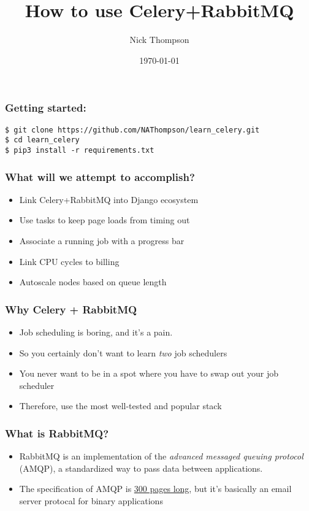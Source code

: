 \documentclass[9pt]{beamer}
\begin{document}
\title{How to use Celery+RabbitMQ}
\author{Nick Thompson} 
\date{\today}

\frame{\titlepage}

\begin{frame}[fragile]
\frametitle{Getting started:}
\begin{verbatim}
$ git clone https://github.com/NAThompson/learn_celery.git
$ cd learn_celery
$ pip3 install -r requirements.txt
\end{verbatim}
\end{frame}

\begin{frame}[fragile]
  \frametitle{What will we attempt to accomplish?}
  
  \begin{itemize}
  \item Link Celery+RabbitMQ into Django ecosystem
    \pause
  \item Use tasks to keep page loads from timing out
    \pause
  \item Associate a running job with a progress bar
    \pause
  \item Link CPU cycles to billing
    \pause
  \item Autoscale nodes based on queue length
  \end{itemize}
\end{frame}

\begin{frame}[fragile]
  \frametitle{Why Celery + RabbitMQ}
  \begin{itemize}
  \item Job scheduling is boring, and it's a pain.
    \pause
  \item So you certainly don't want to learn \emph{two} job schedulers
    \pause
  \item You never want to be in a spot where you have to swap out your job scheduler
    \pause
  \item Therefore, use the most well-tested and popular stack
  \end{itemize}
\end{frame}

\begin{frame}[fragile]
  \frametitle{What is RabbitMQ?}
  \begin{itemize}
  \item RabbitMQ is an implementation of the \emph{advanced messaged queuing protocol} (AMQP), a standardized way to pass data between applications.
  \item The specification of AMQP is \href{http://www.amqp.org/specification/0-10/amqp-org-download}{300 pages long}, but it's basically an email server protocal for binary applications
  \end{itemize}
\end{frame}
\end{document}
